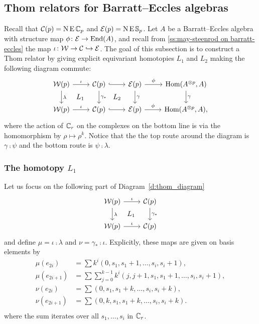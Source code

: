 \subsection{Thom relators for Barratt--Eccles algebras}

Recall that $\mathcal{C}(p) = \operatorname{N}\operatorname{E} \mathbb{C}_p$ and $\mathcal{E}(p) = \operatorname{N}\operatorname{E} \mathbb{S}_p$.
Let $A$ be a Barratt--Eccles algebra with structure map $\phi \colon \mathcal{E} \to \mathrm{End}(A)$, and recall from \cref{ss:may-steenrod on barratt-eccles} the map $\iota \colon \mathcal{W} \to \mathcal{C} \hookrightarrow \mathcal{E}$.
The goal of this subsection is to construct a Thom relator by giving explicit equivariant homotopies $L_1$ and $L_2$ making the following diagram commute:
\begin{equation}\label{d:thom_diagram}
	\begin{tikzcd}
		\cW(p) \arrow[r, "\iota"] \arrow[d,"\lambda"] \arrow[dr,phantom,"L_1"] &
		\cC(p) \arrow[r, hook] \arrow[d, "\gamma_\ast"] \arrow[dr,phantom,"L_2"] &
		\BE(p) \arrow[r,"\phi"] \arrow[d,"\gamma"] &
		\Hom(A^{\ot p}, A) \arrow[d,"\gamma"] \\
		\cW(p) \arrow[r, "\iota"] &
		\cC(p) \arrow[r, hook] &
		\BE(p) \arrow[r,"\phi"] &
		\Hom(A^{\ot p}, A),
	\end{tikzcd}
\end{equation}
where the action of $\mathbb{C}_r$ on the complexes on the bottom line is via the homomorphism by $\rho \mapsto \rho^k$.
Notice that the the top route around the diagram is $\gamma \comp \psi$ and the bottom route is $\psi \comp \lambda$.

\subsubsection{The homotopy $L_1$}

Let us focus on the following part of Diagram~\eqref{d:thom_diagram}
\[
\begin{tikzcd}
	\cW(p) \arrow[r, "\iota"] \arrow[d,"\lambda"] \arrow[dr,phantom,"L_1"] &
	\cC(p) \arrow[d, "\gamma_\ast"]\\
	\cW(p) \arrow[r, "\iota"] &
	\cC(p)
\end{tikzcd}
\]
and define $\mu = \iota \comp \lambda$ and $\nu = \gamma_* \comp \iota$.
Explicitly, these maps are given on basis elements by
\begin{align*}
	\mu(e_{2i}) &= \sum k^i (0,s_1,s_1+1,\ldots,s_i,s_i+1),  \\
	\mu(e_{2i+1}) &= \sum\sum_{j=0}^{k-1} k^i (j,j+1,s_1,s_1+1,\ldots,s_i,s_i+1), \\
	\nu(e_{2i}) &= \sum(0,s_1,s_1+k,\ldots,s_i,s_i+k), \\
	\nu(e_{2i+1}) &= \sum (0,k,s_1,s_1+k,\ldots,s_i,s_i+k). \\
\end{align*}
where the sum iterates over all $s_1,\ldots,s_i$ in $\mathbb{C}_r$.

